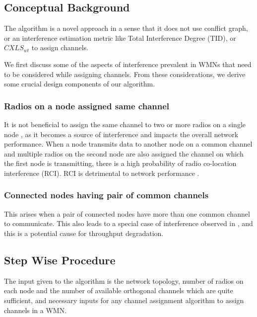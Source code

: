 \documentclass[conference]{IEEEtran}
\begin{document}
\subsection{Conceptual Background }

The algorithm is a novel approach in a sense that it does not use conflict graph, or an interference estimation metric like 
Total Interference Degree (TID), or $CXLS_{wt}$ \cite{kala2015reliable} 
to assign channels.  

We first discuss some of the aspects of interference prevalent in WMNs that need to be considered while assigning channels. 
From these considerations, we derive some crucial design components of our algorithm.

\subsubsection{Radios  on a node assigned same channel}                                      
It is not beneficial to assign the same channel to two or more radios on a single node \cite{kala2016interference},
as it becomes a source of interference and impacts the overall network performance. 
When a node transmits data to another node on a common channel and multiple radios on the  second node are also assigned the channel on which the first
node is transmitting, there is a high probability of radio co-location interference (RCI). RCI is detrimental to network performance \cite{kala2016interference}. 

\subsubsection{Connected nodes having pair of common channels}
                                  

This arises when a pair of connected nodes have more than one common channel to communicate. 
This also leads to a special case of interference observed in \cite{kala2016interference}, 
and this is a potential cause for throughput degradation.


\subsection{Step Wise Procedure}

The input given to the algorithm is the network topology, 
number of radios on  each node and the number of available orthogonal channels which are quite sufficient, 
 and necessary inputs for any channel assignment algorithm to assign channels in a WMN.
 
\end{document}
